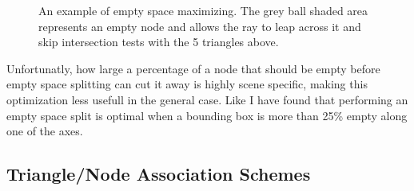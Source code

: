 \begin{figure}
  \centering

  \vspace{3mm}
  \parbox{6cm}{\caption[Empty space maximization.]{An example of empty
      space maximizing. The grey ball shaded area represents an empty
      node and allows the ray to leap across it and skip intersection
      tests with the 5 triangles above.}\label{fig:emptySpaceExample}}
\end{figure}


Unfortunatly, how large a percentage of a node that should be empty
before empty space splitting can cut it away is highly scene specific,
making this optimization less usefull in the general case. Like \zhou{}
I have found that performing an empty space split is optimal when a
bounding box is more than 25\% empty along one of the axes.




\subsection{Triangle/Node Association Schemes}\label{sec:splittingSchemes}


